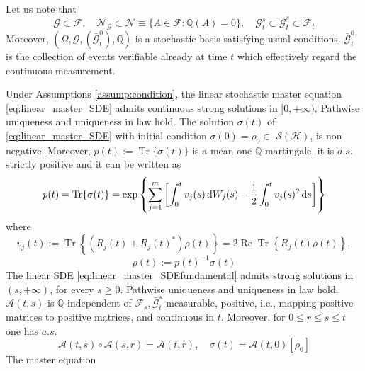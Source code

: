 Let us note that
\[ \mathcal{G} \subset \mathcal{F}, \quad \mathcal{N}_{\mathcal{G}} \subset \mathcal{N} \equiv\{A \in \mathcal{F}: \mathbb{Q}(A)=0\}, \quad \mathcal{G}_{t}^{s} \subset \bar{\mathcal{G}}_{t}^{s} \subset \mathcal{F}_{t} \] Moreover, $\left(\Omega, \mathcal{G},\left(\bar{\mathcal{G}}_{t}^{0}\right), \mathbb{Q}\right)$ is a stochastic basis satisfying usual conditions. $ \bar{\mathcal{G}}_{t}^{0}$ is the collection of events verifiable already at time $t$ which effectively regard the continuous measurement.
\begin{theorem}
	Under Assumptions \ref{assump:condition}, the linear stochastic master equation \eqref{eq:linear_master_SDE} admits continuous strong solutions in $[0,+\infty)$. Pathwise uniqueness and uniqueness in law hold. The solution $\sigma(t)$ of \eqref{eq:linear_master_SDE} with initial condition $\sigma(0)=\rho_{0} \in$ $\mathcal{S}(\mathcal{H})$, is non-negative. Moreover, $p(t):=\operatorname{Tr}\{\sigma(t)\}$ is a mean one $\mathbb{Q}$-martingale, it is $a.s.$ strictly positive and it can be written as  \begin{equation}\label{conclusion:expression_p(t)}
	p(t)=\operatorname{Tr}\{\sigma(t)\}=\exp \left\{\sum_{j=1}^{m}\left[\int_{0}^{t} v_{j}(s) \,\mathrm{d} W_{j}(s)-\frac{1}{2} \int_{0}^{t} v_{j}(s)^{2} \,\mathrm{d} s\right]\right\}
	\end{equation} where
	 \begin{equation}\label{def:v(j)}
	v_{j}(t):=\operatorname{Tr}\left\{\left(R_{j}(t)+R_{j}(t)^{*}\right) \rho(t)\right\}=2 \operatorname{Re} \operatorname{Tr}\left\{R_{j}(t) \rho(t)\right\},
	 \end{equation}
	 \begin{equation}\label{def:rho}
	  \rho(t):=p(t)^{-1} \sigma(t)
	 \end{equation}
	The linear SDE \eqref{eq:linear_master_SDEfundamental} admits strong solutions in $(s,+\infty)$, for every $s \geq 0$. Pathwise uniqueness and uniqueness in law hold. $\mathcal{A}(t, s)$ is $ \mathbb{Q} $-independent of $\mathcal{F}_{s}, \bar{\mathcal{G}}_{t}^{s}$ measurable, positive, i.e., mapping positive matrices to positive matrices, and continuous in $t$. Moreover, for $0 \leq r \leq s \leq t$ one has $a.s.$
	 \begin{equation}\label{conclusion:composition_fundamental_solution}
	\mathcal{A}(t, s) \circ \mathcal{A}(s, r)=\mathcal{A}(t, r), \quad \sigma(t)=\mathcal{A}(t, 0)\left[\rho_{0}\right]
	\end{equation}
	The master equation
	 \begin{equation}\label{eq:master_equation}

\end{equation}
\end{theorem}
